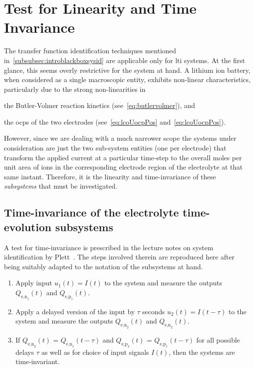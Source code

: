 \section{Test for Linearity and Time Invariance}\label{sec:lticheck}
The      transfer     function      identification     techniques      mentioned
in~\cref{subsubsec:introblackboxsysid}   are  applicable  only   for   \gls{lti}
systems.  At the  first glance,  this seems  overly restrictive  for the  system
at  hand.  A lithium  ion  battery,  when  considered  as a  single  macroscopic
entity,  exhibits non-linear  characteristics,  particularly due  to the  strong
non-linearities in
\begin{enumerate*}[label=\emph{\alph*})]
    \item the Butler-Volmer reaction kinetics (see~\cref{eq:butlervolmer}), and
    \item the \glspl{ocp} of the two electrodes (see~\cref{eq:lcoUocpPos} and~\cref{eq:lcoUocpPos}).
\end{enumerate*}
However, since we are dealing with a much narrower scope \ie{} the systems under
consideration  are just  the two  sub-system entities  (one per  electrode) that
transform the  applied current at  a particular  time-step to the  overall moles
per  unit area  of    ions in  the  corresponding  electrode region  of
the  electrolyte at  that  same  instant. Therefore,  it  is  the linearity  and
time-invariance of these \emph{subsystems} that must be investigated.

\subsection{Time-invariance of the electrolyte time-evolution subsystems}\label{subsubsec:timeinvariance}
A  test  for time-invariance  is  prescribed  in  the  lecture notes  on  system
identification by  Plett~\cite{PlettECE5560_02}. The steps involved  therein are
reproduced here after  being suitably adapted to the notation  of the subsystems
at hand.
\begin{enumerate}
    \item Apply input $u_1(t) = I(t)$ to the system and measure the outputs $Q_{\text{e,n}_1}\!(t)$ and $Q_{\text{e,p}_1}\!(t)$.
    \item Apply a delayed version of the input by $\tau$ seconds \ie{} $u_2(t) = I(t-\tau)$ to the system and measure the outputs $Q_{\text{e,n}_2}\!(t)$ and $Q_{\text{e,n}_2}\!(t)$.
    \item If $Q_{\text{e,n}_2}\!(t)$ = $Q_{\text{e,n}_1}\!(t-\tau)$ and $Q_{\text{e,p}_2}\!(t)$ = $Q_{\text{e,p}_1}\!(t-\tau)$ for all possible delays $\tau$ as well as for choice of input signals $I(t)$, then the systems are time-invariant.
\end{enumerate}

